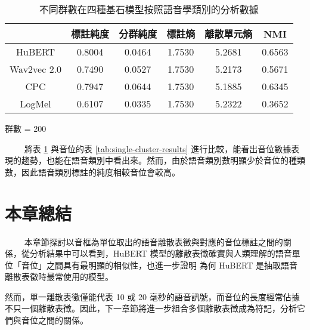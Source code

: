 \begin{table}[!htbp]
    \begin{subtable}[t]{\textwidth}
        \centering
        \begin{tabular}{|c|c|c|c|c|c|} \hline
                        & 標註純度   & 分群純度   & 標註熵    & 離散單元熵  & NMI    \\ \hline
            HuBERT      & 0.8004 & 0.0464 & 1.7530 & 5.2681 & 0.6563 \\ \hline    %
            Wav2vec 2.0 & 0.7490 & 0.0527 & 1.7530 & 5.2173 & 0.5671 \\ \hline    %
            CPC         & 0.7947 & 0.0644 & 1.7530 & 5.1885 & 0.6345 \\ \hline    %
            LogMel      & 0.6107 & 0.0335 & 1.7530 & 5.2322 & 0.3652 \\ \hline    %
        \end{tabular}
        \caption{群數 = 200}
        \label{tab:ch3-clu200-pcls}
    \end{subtable}

    \caption{不同群數在四種基石模型按照語音學類別的分析數據}
    \label{tab:single-cluster-phonetype-results}
\end{table}
　　
將表 \ref{tab:single-cluster-phonetype-results} 與音位的表 \ref{tab:single-cluster-results} 進行比較，能看出音位數據表現的趨勢，也能在語音類別中看出來。然而，由於語音類別數明顯少於音位的種類數，因此語音類別標註的純度相較音位會較高。


\section{本章總結}
　　
本章節探討以音框為單位取出的語音離散表徵與對應的音位標註之間的關係，從分析結果中可以看到，HuBERT 模型的離散表徵確實與人類理解的語音單位「音位」之間具有最明顯的相似性，也進一步證明
為何 HuBERT 是抽取語音離散表徵時最常使用的模型。


然而，單一離散表徵僅能代表 10 或 20 毫秒的語音訊號，而音位的長度經常佔據不只一個離散表徵。因此，下一章節將進一步組合多個離散表徵成為符記，分析它們與音位之間的關係。
